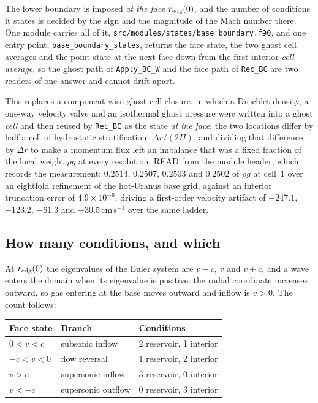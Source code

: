 \documentclass[english,a4paper]{my_memo}
\begin{document}
The lower boundary is imposed \emph{at the face} $r_{\rm edg}(0)$, and the
number of conditions it states is decided by the sign and the magnitude of
the Mach number there. One module carries all of it,
\texttt{src/modules/states/base\_boundary.f90}, and one entry point,
\texttt{base\_boundary\_states}, returns the face state, the two ghost cell
averages and the point state at the next face down from the first interior
\emph{cell average}, so the ghost path of \texttt{Apply\_BC\_W} and the face
path of \texttt{Rec\_BC} are two readers of one answer and cannot drift
apart.

This replaces a component-wise ghost-cell closure, in which a Dirichlet
density, a one-way velocity valve and an isothermal ghost pressure were
written into a ghost \emph{cell} and then reused by \texttt{Rec\_BC} as the
state \emph{at the face}; the two locations differ by half a cell of
hydrostatic stratification, $\Delta r/(2H)$, and dividing that difference by
$\Delta r$ to make a momentum flux left an imbalance that was a fixed
fraction of the local weight $\rho g$ at every resolution. READ from the
module header, which records the measurement: $0.2514$, $0.2507$, $0.2503$
and $0.2502$ of $\rho g$ at cell~1 over an eightfold refinement of the
hot-Uranus base grid, against an interior truncation error of
$4.9\times10^{-6}$, driving a first-order velocity artifact of $-247.1$,
$-123.2$, $-61.3$ and $-30.5$\,cm\,s$^{-1}$ over the same ladder.

\subsection{How many conditions, and which}
\label{sec:charbranches}

At $r_{\rm edg}(0)$ the eigenvalues of the Euler system are $v-c$, $v$ and
$v+c$, and a wave enters the domain when its eigenvalue is positive: the
radial coordinate increases outward, so gas entering at the base moves
outward and inflow is $v>0$. The count follows:

\begin{center}\small
\begin{tabular}{@{}lll@{}}
\toprule
Face state & Branch & Conditions \\
\midrule
$0 < v < c$   & subsonic inflow      & 2 reservoir, 1 interior \\
$-c < v < 0$  & flow reversal        & 1 reservoir, 2 interior \\
$v > c$       & supersonic inflow    & 3 reservoir, 0 interior \\
$v < -c$      & supersonic outflow   & 0 reservoir, 3 interior \\
\bottomrule
\end{tabular}
\end{center}
\end{document}
